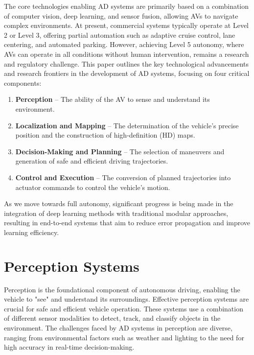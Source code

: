 \documentclass[12pt,a4paper]{article}
\begin{document}
The core technologies enabling AD systems are primarily based on a combination of computer vision, deep learning, and sensor fusion, allowing AVs to navigate complex environments. At present, commercial systems typically operate at Level 2 or Level 3, offering partial automation such as adaptive cruise control, lane centering, and automated parking. However, achieving Level 5 autonomy, where AVs can operate in all conditions without human intervention, remains a research and regulatory challenge. This paper outlines the key technological advancements and research frontiers in the development of AD systems, focusing on four critical components:
\begin{enumerate}[label=1.]
    \item \textbf{Perception} – The ability of the AV to sense and understand its environment.
    \item \textbf{Localization and Mapping} – The determination of the vehicle's precise position and the construction of high-definition (HD) maps.
    \item \textbf{Decision-Making and Planning} – The selection of maneuvers and generation of safe and efficient driving trajectories.
    \item \textbf{Control and Execution} – The conversion of planned trajectories into actuator commands to control the vehicle's motion.
\end{enumerate}

As we move towards full autonomy, significant progress is being made in the integration of deep learning methods with traditional modular approaches, resulting in end-to-end systems that aim to reduce error propagation and improve learning efficiency.

\section{Perception Systems}
Perception is the foundational component of autonomous driving, enabling the vehicle to "see" and understand its surroundings. Effective perception systems are crucial for safe and efficient vehicle operation. These systems use a combination of different sensor modalities to detect, track, and classify objects in the environment. The challenges faced by AD systems in perception are diverse, ranging from environmental factors such as weather and lighting to the need for high accuracy in real-time decision-making.
\end{document}
